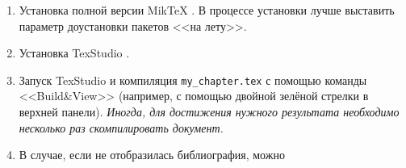 \begin{enumerate}
	\item Установка полной версии MikTeX  \cite{latex-miktex}.  В процессе установки лучше выставить параметр доустановки пакетов <<на лету>>.
	
	\item Установка TexStudio \cite{latex-texstudio}.
	
	
%	
%	
%	
%	
	
	\item Запуск TexStudio и компиляция \verb|my_chapter.tex| с помощью команды <<Build\&View>> (например, с помощью двойной зелёной стрелки в верхней панели). {\itshape Иногда, для достижения нужного результата необходимо несколько раз скомпилировать документ.}
	
	\item В случае, если не отобразилась библиография, можно
	

\end{enumerate}
